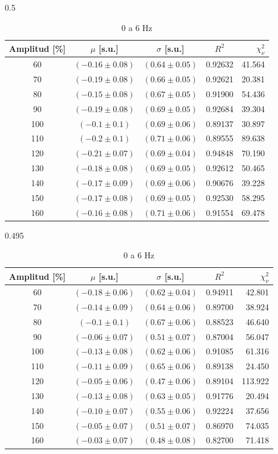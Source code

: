 \begin{landscape}
\begin{table}
\begin{subtable}{0.5\linewidth}
\centering
\caption{0 a 5 Hz} %
{\small
\renewcommand{\arraystretch}{0.92585}
\begin{tabular}{c c c c r} %
\toprule
Amplitud [\%] & $\mu$ [s.u.] & $\sigma$ [s.u.] & $R^2$ & $\chi_\nu^2$\\
\midrule
60 & $(-0.16\pm0.08)$  & $(0.64\pm0.05)$  & 0.92632 & 41.564\\
70 & $(-0.19\pm0.08)$  & $(0.66\pm0.05)$  & 0.92621 & 20.381\\
80 & $(-0.15\pm0.08)$  & $(0.67\pm0.05)$  & 0.91900 & 54.436\\
90 & $(-0.19\pm0.08)$  & $(0.69\pm0.05)$  & 0.92684 & 39.304\\
100 & $(-0.1\pm0.1)$  & $(0.69\pm0.06)$  & 0.89137 & 30.897\\
110 & $(-0.2\pm0.1)$  & $(0.71\pm0.06)$  & 0.89555 & 89.638\\
120 & $(-0.21\pm0.07)$  & $(0.69\pm0.04)$  & 0.94848 & 70.190\\
130 & $(-0.18\pm0.08)$  & $(0.69\pm0.05)$  & 0.92612 & 50.465\\
140 & $(-0.17\pm0.09)$  & $(0.69\pm0.06)$  & 0.90676 & 39.228\\
150 & $(-0.17\pm0.08)$  & $(0.69\pm0.05)$  & 0.92530 & 58.295\\
160 & $(-0.16\pm0.08)$  & $(0.71\pm0.06)$  & 0.91554 & 69.478\\
\bottomrule
\end{tabular}}
\end{subtable}
\begin{subtable}{0.495\linewidth} 
\centering 
\caption{0 a 6 Hz} %
{\small
\renewcommand{\arraystretch}{0.95285} 
\begin{tabular}{c c c c r} %
\toprule
Amplitud [\%] & $\mu$ [s.u.] & $\sigma$ [s.u.] & $R^2$ & $\chi_\nu^2$\\
\midrule
60 & $(-0.18\pm0.06)$  & $(0.62\pm0.04)$  & 0.94911 & 42.801\\
70 & $(-0.14\pm0.09)$  & $(0.64\pm0.06)$  & 0.89700 & 38.924\\
80 & $(-0.1\pm0.1)$  & $(0.67\pm0.06)$  & 0.88523 & 46.640\\
90 & $(-0.06\pm0.07)$  & $(0.51\pm0.07)$  & 0.87004 & 56.047\\
100 & $(-0.13\pm0.08)$  & $(0.62\pm0.06)$  & 0.91085 & 61.316\\
110 & $(-0.11\pm0.09)$  & $(0.65\pm0.06)$  & 0.89138 & 24.450\\
120 & $(-0.05\pm0.06)$  & $(0.47\pm0.06)$  & 0.89104 & 113.922\\
130 & $(-0.13\pm0.08)$  & $(0.63\pm0.05)$  & 0.91776 & 20.494\\
140 & $(-0.10\pm0.07)$  & $(0.55\pm0.06)$  & 0.92224 & 37.656\\
150 & $(-0.05\pm0.07)$  & $(0.51\pm0.07)$  & 0.86970 & 74.035\\
160 & $(-0.03\pm0.07)$  & $(0.48\pm0.08)$  & 0.82700 & 71.418\\
\bottomrule
\end{tabular}}
\end{subtable}


\end{table}
\end{landscape}
